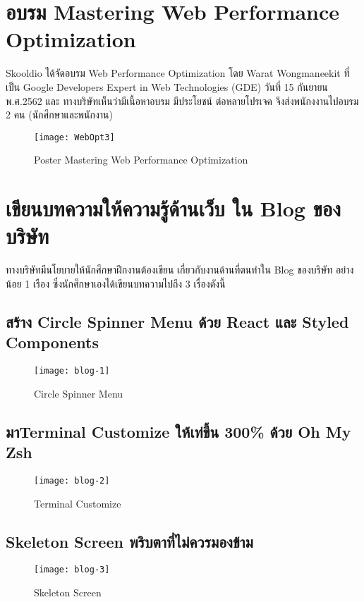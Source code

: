 \section{อบรม Mastering Web Performance Optimization}
Skooldio ได้จัดอบรม  Web Performance Optimization โดย Warat Wongmaneekit 
ที่เป็น Google Developers Expert in Web Technologies (GDE) วันที่ 15 กันยายน พ.ศ.2562 และ ทางบริษัทเห็นว่ามีเนื้อหาอบรม
มีประโยชน์ ต่อหลายโปรเจค จึงส่งพนักงงานไปอบรม 2 คน (นักศึกษาและพนักงาน)
\begin{figure}[!htbp]
	\centering
	\texttt{[image: WebOpt3]}
	\caption{Poster Mastering Web Performance Optimization}
	\label{Fig:WebPerformance}
\end{figure}
\newpage
\section{เขียนบทความให้ความรู้ด้านเว็บ ใน Blog ของบริษัท }
ทางบริษัทมีนโยบายให้นักศึกษาฝึกงานต้องเขียน เกี่ยวกับงานด้านที่ตนทำใน Blog ของบริษัท อย่างน้อย 1 เรือง
ซึ่งนักศึกษาเองได้เขียนบทความไปถึง 3 เรื่องดังนี้
 \subsection{สร้าง Circle Spinner Menu ด้วย React และ Styled Components}
 \begin{figure}[!htbp]
	\centering
	\texttt{[image: blog-1]}
	\caption{Circle Spinner Menu}
	\label{Fig:WebPerformance}
\end{figure}
\newpage
 \subsection{มาTerminal Customize ให้เท่ขึ้น 300\% ด้วย Oh My Zsh}
 \begin{figure}[!htbp]
	\centering
	\texttt{[image: blog-2]}
	\caption{Terminal Customize}
	\label{Fig:WebPerformance}
\end{figure}
 \subsection{Skeleton Screen พริบตาที่ไม่ควรมองข้าม}
 \begin{figure}[!htbp]
	\centering
	\texttt{[image: blog-3]}
	\caption{Skeleton Screen}
	\label{Fig:WebPerformance}
\end{figure}